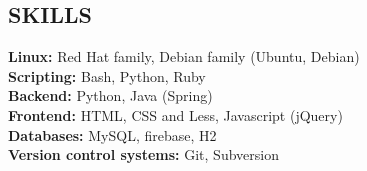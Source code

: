 \documentclass[margin,line]{resume}
\begin{document}
\begin{resume}
    \section{\mysidestyle \textbf{\large{S}\small{KILLS} }}

    \textbf{Linux:} Red Hat family, Debian family (Ubuntu, Debian)\\
    \textbf{Scripting:} Bash, Python, Ruby\\
    \textbf{Backend:} Python, Java (Spring)\\
    \textbf{Frontend:} HTML, CSS and Less, Javascript (jQuery)\\
    \textbf{Databases:} MySQL, firebase, H2\\
    \textbf{Version control systems:} Git, Subversion\\
    
\end{resume}
\end{document}
